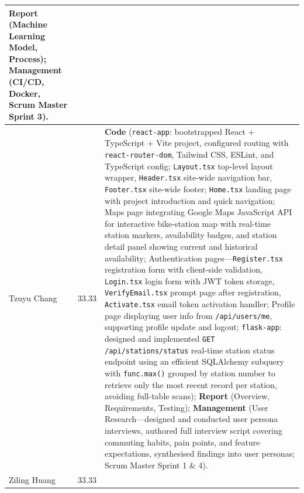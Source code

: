 \documentclass[11pt,a4paper]{article}
\begin{document}
\begin{longtable}{@{}p{2.2cm}p{1cm}p{11.5cm}@{}}
\textbf{Report} (Machine Learning Model, Process); 
\textbf{Management} (CI/CD, Docker, Scrum Master Sprint 3). \\
\midrule
Tzuyu Chang & 33.33 & 
\textbf{Code} (\texttt{react-app}: bootstrapped React + TypeScript + Vite project, configured routing with \texttt{react-router-dom}, Tailwind CSS, ESLint, and TypeScript config; \texttt{Layout.tsx} top-level layout wrapper, \texttt{Header.tsx} site-wide navigation bar, \texttt{Footer.tsx} site-wide footer; \texttt{Home.tsx} landing page with project introduction and quick navigation; Maps page integrating Google Maps JavaScript API for interactive bike-station map with real-time station markers, availability badges, and station detail panel showing current and historical availability; Authentication pages---\texttt{Register.tsx} registration form with client-side validation, \texttt{Login.tsx} login form with JWT token storage, \texttt{VerifyEmail.tsx} prompt page after registration, \texttt{Activate.tsx} email token activation handler; Profile page displaying user info from \texttt{/api/users/me}, supporting profile update and logout; \texttt{flask-app}: designed and implemented \texttt{GET /api/stations/status} real-time station status endpoint using an efficient SQLAlchemy subquery with \texttt{func.max()} grouped by station number to retrieve only the most recent record per station, avoiding full-table scans); 
\textbf{Report} (Overview, Requirements, Testing); 
\textbf{Management} (User Research---designed and conducted user persona interviews, authored full interview script covering commuting habits, pain points, and feature expectations, synthesised findings into user personas; Scrum Master Sprint 1 \& 4). \\
\midrule
Ziling Huang & 33.33 & 

\end{longtable}
\end{document}
